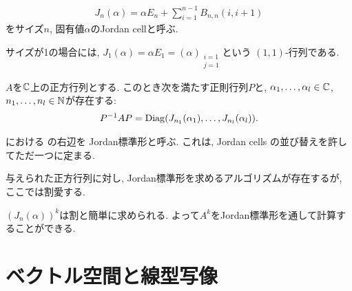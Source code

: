 \begin{definition}
  \begin{align*}
    J_n(\alpha)=\alpha E_n+\sum_{i=1}^{n-1}B_{n,n}(i,i+1)
  \end{align*}
  をサイズ$n$, 固有値$\alpha$のJordan cellと呼ぶ.
\end{definition}
\begin{remark}
  サイズが1の場合には, $J_1(\alpha)=\alpha E_1 = (\alpha)_{\substack{i=1\\j=1}}$という
  $(1,1)$-行列である.
\end{remark}
\begin{theorem}
  \label{thm:jordan:decomp}
  $A$を$\mathbb{C}$上の正方行列とする.
  このとき次を満たす正則行列$P$と, $\alpha_1,\ldots,\alpha_l \in \mathbb{C}$,
  $n_1,\ldots, n_l\in\mathbb{N}$が存在する:
  \begin{align}
    P^{-1}AP=\operatorname{Diag}(J_{n_1}(\alpha_1),\ldots,J_{n_l}(\alpha_l)).
    \label{eq:jordan:decomp}
  \end{align}
\end{theorem}
\begin{remark}
  における
  の右辺を
  Jordan標準形と呼ぶ.
  これは,
  Jordan cells の並び替えを許してただ一つに定まる.
\end{remark}
\begin{remark}
  与えられた正方行列に対し,
  Jordan標準形を求めるアルゴリズムが存在するが,
  ここでは割愛する.
\end{remark}
\begin{remark}
  $(J_n(\alpha))^k$は割と簡単に求められる.
  よって$A^k$をJordan標準形を通して計算することができる.
\end{remark}

\section{ベクトル空間と線型写像}
